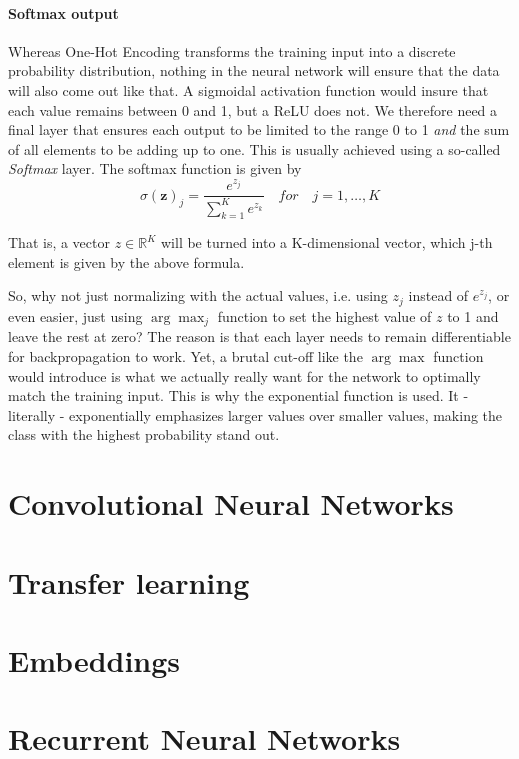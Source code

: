 \paragraph{Softmax output} Whereas One-Hot Encoding transforms the training input into a discrete probability distribution, nothing in the neural network will ensure that the data will also come out like that. A sigmoidal activation function would insure that each value remains between 0 and 1, but a ReLU does not. We therefore need a final layer that ensures each output to be limited to the range 0 to 1 \textsl{and} the sum of all elements to be adding up to one. This is usually achieved using a so-called \textsl{Softmax} layer. The softmax function is given by
\begin{equation}
{\sigma (\mathbf {z} )_{j}={\frac {e^{z_{j}}}{\sum _{k=1}^{K}e^{z_{k}}}}} \quad for \quad j=1,\ldots,K
\end{equation}

That is, a vector $z \in \mathbb{R}^K$ will be turned into a K-dimensional vector, which j-th element is given by the above formula.

So, why not just normalizing with the actual values, i.e. using $z_j$ instead of $e^{z_j}$, or even easier, just using $\arg \max_j$ function to set the highest value of $z$ to 1 and leave the rest at zero? The reason is that each layer needs to remain differentiable for backpropagation to work. Yet, a brutal cut-off like the $\arg \max$ function would introduce is what we actually really want for the network to optimally match the training input. This is why the exponential function is used. It - literally - exponentially emphasizes larger values over smaller values, making the class with the highest probability stand out.

\section{Convolutional Neural Networks}

\section{Transfer learning}

\section{Embeddings}

\section{Recurrent Neural Networks}

